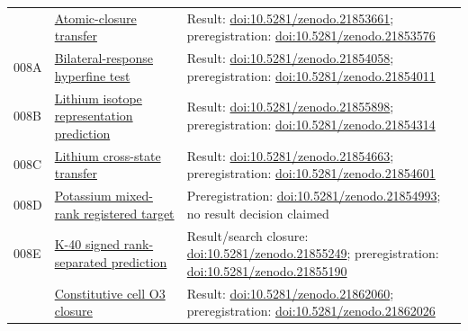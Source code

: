 \documentclass[11pt,a4paper]{article}
\begin{document}
\begin{longtable}{@{}>{\raggedright\arraybackslash}p{1.2cm}>{\raggedright\arraybackslash}p{5.0cm}>{\raggedright\arraybackslash}p{7.8cm}@{}}
008 & \href{https://github.com/SIEL-Research/Subjectivity-Intersection-Mathematics/tree/main/experiments/008_preregistered_atomic_closure_transfer}{Atomic-closure transfer} & Result: \href{https://doi.org/10.5281/zenodo.21853661}{doi:10.5281/zenodo.21853661}; preregistration: \href{https://doi.org/10.5281/zenodo.21853576}{doi:10.5281/zenodo.21853576} \\
008A & \href{https://github.com/SIEL-Research/Subjectivity-Intersection-Mathematics/tree/main/experiments/008a_bilateral_reentry_hyperfine_prediction}{Bilateral-response hyperfine test} & Result: \href{https://doi.org/10.5281/zenodo.21854058}{doi:10.5281/zenodo.21854058}; preregistration: \href{https://doi.org/10.5281/zenodo.21854011}{doi:10.5281/zenodo.21854011} \\
008B & \href{https://github.com/SIEL-Research/Subjectivity-Intersection-Mathematics/tree/main/experiments/008b_pyscf_lithium_spin_representation_prediction}{Lithium isotope representation prediction} & Result: \href{https://doi.org/10.5281/zenodo.21855898}{doi:10.5281/zenodo.21855898}; preregistration: \href{https://doi.org/10.5281/zenodo.21854314}{doi:10.5281/zenodo.21854314} \\
008C & \href{https://github.com/SIEL-Research/Subjectivity-Intersection-Mathematics/tree/main/experiments/008c_lithium_2p_cross_state_transfer}{Lithium cross-state transfer} & Result: \href{https://doi.org/10.5281/zenodo.21854663}{doi:10.5281/zenodo.21854663}; preregistration: \href{https://doi.org/10.5281/zenodo.21854601}{doi:10.5281/zenodo.21854601} \\
008D & \href{https://github.com/SIEL-Research/Subjectivity-Intersection-Mathematics/tree/main/experiments/008d_pyscf_potassium_mixed_rank_prediction}{Potassium mixed-rank registered target} & Preregistration: \href{https://doi.org/10.5281/zenodo.21854993}{doi:10.5281/zenodo.21854993}; no result decision claimed \\
008E & \href{https://github.com/SIEL-Research/Subjectivity-Intersection-Mathematics/tree/main/experiments/008e_potassium40_signed_rank_prediction}{K-40 signed rank-separated prediction} & Result/search closure: \href{https://doi.org/10.5281/zenodo.21855249}{doi:10.5281/zenodo.21855249}; preregistration: \href{https://doi.org/10.5281/zenodo.21855190}{doi:10.5281/zenodo.21855190} \\
009 & \href{https://github.com/SIEL-Research/Subjectivity-Intersection-Mathematics/tree/main/experiments/009_constitutive_cell_o3_closure}{Constitutive cell O3 closure} & Result: \href{https://doi.org/10.5281/zenodo.21862060}{doi:10.5281/zenodo.21862060}; preregistration: \href{https://doi.org/10.5281/zenodo.21862026}{doi:10.5281/zenodo.21862026} \\

\end{longtable}
\end{document}
